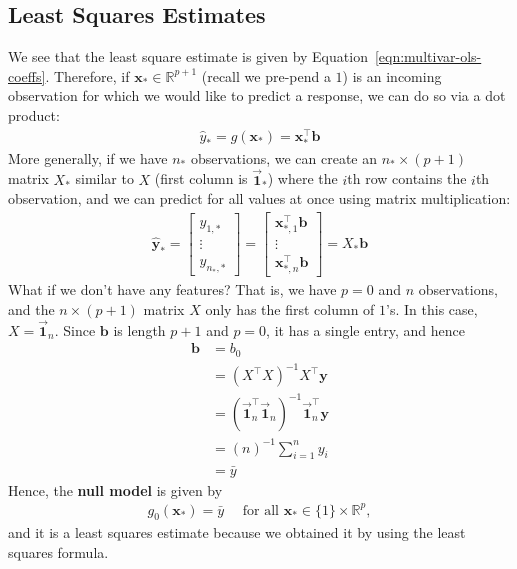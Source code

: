 \documentclass[12pt, a4paper]{article}
\theoremstyle{definition}
\begin{document}
	\subsection*{Least Squares Estimates}
	We see that the least square estimate is given by Equation~\ref{eqn:multivar-ols-coeffs}.
	Therefore, if $\mathbf{x}_*\in\mathbb{R}^{p+1}$ (recall we pre-pend a $1$) is an incoming
	observation for which we would like to predict a response, we can do so via a dot product:
	\begin{align*}
		\hat{y}_* = g(\mathbf{x}_*) = \mathbf{x}_*^\top \mathbf{b}
	\end{align*}
	More generally, if we have $n_*$ observations, we can create an $n_*\times (p+1)$ matrix
	$X_*$ similar to $X$ (first column is $\vec{\mathbf{1}}_*$) where the $i$th row contains the $i$th observation,
	and we can predict for all values at once using matrix multiplication:
	\begin{align*}
		\hat{\mathbf{y}}_*=\begin{bmatrix}
			\hat{y}_{1, *}\\
			\vdots\\
			\hat{y}_{n_*, *}
		\end{bmatrix}
		=\begin{bmatrix}
			\mathbf{x}_{*, 1}^\top \mathbf{b}\\
			\vdots\\
			\mathbf{x}_{*, n}^\top \mathbf{b}
		\end{bmatrix}
		=X_* \mathbf{b}
	\end{align*}
	What if we don't have any features? That is, we have $p=0$ and $n$ observations,
	and the $n\times (p+1)$ matrix $X$ only has the first column of $1$'s. In this case,
	$X =\vec{\mathbf{1}}_n$. Since $\mathbf{b}$ is length $p+1$ and $p=0$,
	it has a single entry, and hence
	\begin{align*}
		\mathbf{b} &= b_0\\
		& = (X^\top X)^{-1} X^\top \mathbf{y}\\
		&=(\vec{\mathbf{1}}_n^\top \vec{\mathbf{1}}_n)^{-1} \vec{\mathbf{1}}_n^\top\mathbf{y}\\
		&=(n)^{-1}\sum_{i=1}^{n}y_i\\
		&=\bar{y}
	\end{align*}
	Hence, the \textbf{null model} is given by
	\begin{align*}
		g_0(\mathbf{x}_*)=\bar{y} \quad \text{ for all }\mathbf{x}_*\in \{1\} \times \mathbb{R}^{p},
	\end{align*}
	and it is a least squares estimate because we obtained it by using the least squares formula.
\end{document}
